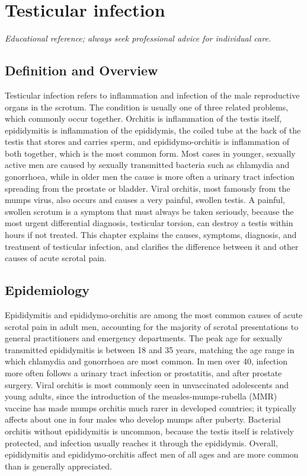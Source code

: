 \chapter{Testicular infection}

\medskip
\noindent\textit{Educational reference; always seek professional advice for individual care.}

\section*{Definition and Overview}
Testicular infection refers to inflammation and infection of the male reproductive organs in the scrotum. The condition is usually one of three related problems, which commonly occur together. Orchitis is inflammation of the testis itself, epididymitis is inflammation of the epididymis, the coiled tube at the back of the testis that stores and carries sperm, and epididymo-orchitis is inflammation of both together, which is the most common form. Most cases in younger, sexually active men are caused by sexually transmitted bacteria such as chlamydia and gonorrhoea, while in older men the cause is more often a urinary tract infection spreading from the prostate or bladder. Viral orchitis, most famously from the mumps virus, also occurs and causes a very painful, swollen testis. A painful, swollen scrotum is a symptom that must always be taken seriously, because the most urgent differential diagnosis, testicular torsion, can destroy a testis within hours if not treated. This chapter explains the causes, symptoms, diagnosis, and treatment of testicular infection, and clarifies the difference between it and other causes of acute scrotal pain.

\section*{Epidemiology}
Epididymitis and epididymo-orchitis are among the most common causes of acute scrotal pain in adult men, accounting for the majority of scrotal presentations to general practitioners and emergency departments. The peak age for sexually transmitted epididymitis is between 18 and 35 years, matching the age range in which chlamydia and gonorrhoea are most common. In men over 40, infection more often follows a urinary tract infection or prostatitis, and after prostate surgery. Viral orchitis is most commonly seen in unvaccinated adolescents and young adults, since the introduction of the measles-mumps-rubella (MMR) vaccine has made mumps orchitis much rarer in developed countries; it typically affects about one in four males who develop mumps after puberty. Bacterial orchitis without epididymitis is uncommon, because the testis itself is relatively protected, and infection usually reaches it through the epididymis. Overall, epididymitis and epididymo-orchitis affect men of all ages and are more common than is generally appreciated.

